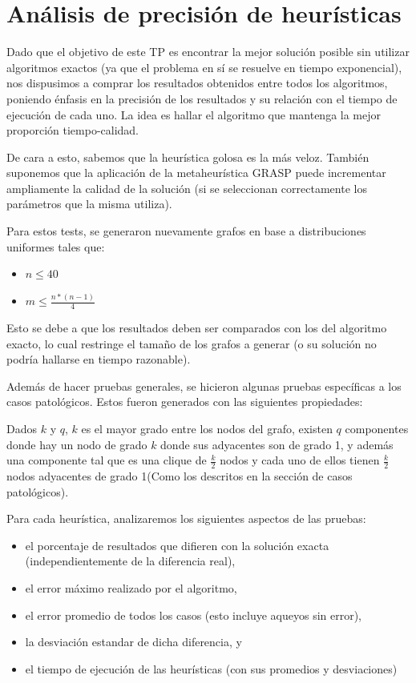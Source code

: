 \section{Análisis de precisión de heurísticas}

Dado que el objetivo de este TP es encontrar la mejor solución posible sin utilizar algoritmos exactos (ya que el problema en sí se resuelve en tiempo exponencial), nos dispusimos a comprar los resultados obtenidos entre todos los algoritmos, poniendo énfasis en la precisión de los resultados y su relación con el tiempo de ejecución de cada uno. La idea es hallar el algoritmo que mantenga la mejor proporción tiempo-calidad.

De cara a esto, sabemos que la heurística golosa es la más veloz. También suponemos que la aplicación de la metaheurística GRASP puede incrementar ampliamente la calidad de la solución (si se seleccionan correctamente los parámetros que la misma utiliza).

Para estos tests, se generaron nuevamente grafos en base a distribuciones uniformes tales que:

\begin{itemize}
	\item $n \leq 40$
	\item $m \leq \frac{n * (n-1)}{4}$
\end{itemize}

Esto se debe a que los resultados deben ser comparados con los del algoritmo exacto, lo cual restringe el tamaño de los grafos a generar (o su solución no podría hallarse en tiempo razonable).

Además de hacer pruebas generales, se hicieron algunas pruebas específicas a los casos patológicos. Estos fueron generados con las siguientes propiedades:

Dados $k$ y $q$, $k$ es el mayor grado entre los nodos del grafo, existen $q$ componentes donde hay un nodo de grado $k$ donde sus adyacentes son de grado 1, y además una componente tal que es una clique de $\frac{k}{2}$ nodos y cada uno de ellos tienen $\frac{k}{2}$ nodos adyacentes de grado 1(Como los descritos en la sección de casos patológicos).

Para cada heurística, analizaremos los siguientes aspectos de las pruebas:

\begin{itemize}
	\item el porcentaje de resultados que difieren con la solución exacta (independientemente de la diferencia real),
	\item el error máximo realizado por el algoritmo,
	\item el error promedio de todos los casos (esto incluye aqueyos sin error),
	\item la desviación estandar de dicha diferencia, y
    \item el tiempo de ejecución de las heurísticas (con sus promedios y desviaciones)
\end{itemize}

